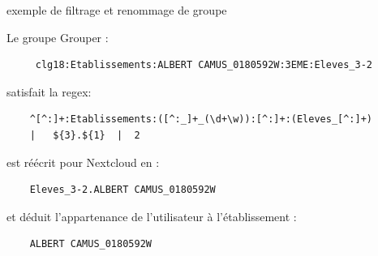 \begin{frame}[fragile]{\sub} %
{exemple de filtrage et renommage de groupe}
\begin{list}{}{}
	\item {\tiny Le groupe Grouper :}
\begin{verbatim}
     clg18:Etablissements:ALBERT CAMUS_0180592W:3EME:Eleves_3-2
\end{verbatim}
\item {\tiny satisfait la regex:}
\begin{verbatim}
    ^[^:]+:Etablissements:([^:_]+_(\d+\w)):[^:]+:(Eleves_[^:]+) 
    |   ${3}.${1}  |  2
\end{verbatim}
\item {\tiny est réécrit pour Nextcloud en :}
\begin{verbatim}
    Eleves_3-2.ALBERT CAMUS_0180592W
\end{verbatim}
\item {\tiny et déduit l’appartenance de l'utilisateur à l'établissement :}
\begin{verbatim}
    ALBERT CAMUS_0180592W
\end{verbatim}
\end{list}
\end{frame}


